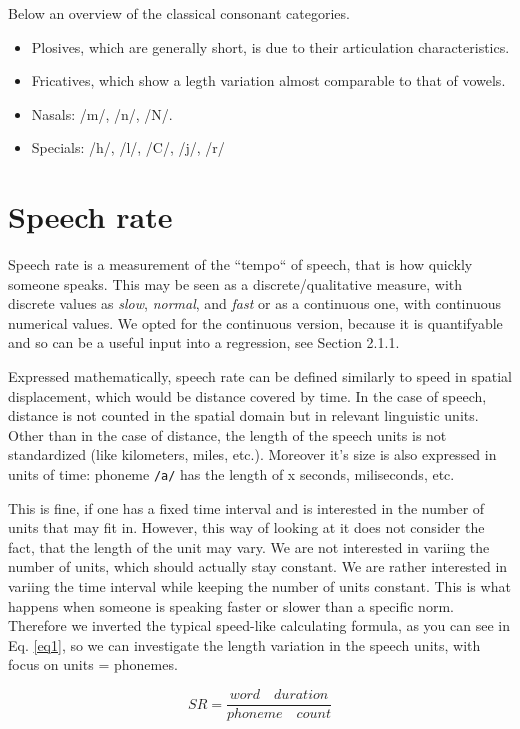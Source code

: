 \documentclass[a4paper]{scrreprt}
\begin{document}
Below an overview of the classical consonant categories.
\begin{itemize}
	\item Plosives, which are generally short, is due to their articulation characteristics.
	\item Fricatives, which show a legth variation almost comparable to that of vowels.
	\item Nasals: /m/, /n/, /N/.
	\item Specials: /h/, /l/, /C/, /j/, /r/
\end{itemize}


\chapter{Speech rate}
Speech rate is a measurement of the ``tempo`` of speech, that is how quickly someone speaks. This may be seen as a discrete/qualitative measure, with discrete values as \textit{slow}, \textit{normal}, and \textit{fast} or as a continuous one, with continuous numerical values.  We opted for the continuous version, because it is quantifyable and so can be a useful input into a regression, see Section 2.1.1.

Expressed mathematically, speech rate can be defined similarly to speed in spatial displacement, which would be distance covered by time. In the case of speech, distance is not counted in the spatial domain but in relevant linguistic units. Other than in the case of distance, the length of the speech units is not standardized (like kilometers, miles, etc.). Moreover it's size is also expressed in units of time: phoneme \texttt{/a/} has the length of x seconds, miliseconds, etc. 

This is fine, if one has a fixed time interval and is interested in the number of units that may fit in. However, this way of looking at it does not consider the fact, that the length of the unit may vary. We are not interested in variing the number of units, which should actually stay constant. We are rather interested in variing the time interval while keeping the number of units constant. This is what happens when someone is speaking faster or slower than a specific norm. Therefore we inverted the typical speed-like calculating formula, as you can see in Eq. \ref{eq1}, so we can investigate the length variation in the speech units, with focus on units = phonemes.

\begin{equation}
\label{eq1}
	SR = \frac{word \quad duration}{phoneme\quad count}
\end{equation}
\end{document}
